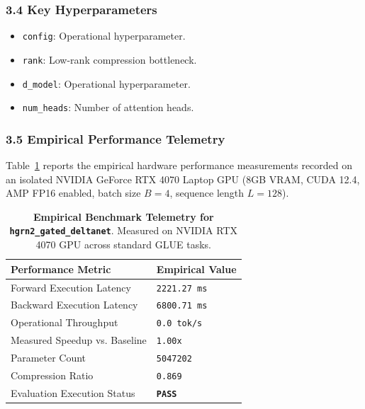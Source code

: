 \subsubsection*{3.4 Key Hyperparameters}
\begin{itemize}
    \item \texttt{config}: Operational hyperparameter.
    \item \texttt{rank}: Low-rank compression bottleneck.
    \item \texttt{d\_model}: Operational hyperparameter.
    \item \texttt{num\_heads}: Number of attention heads.
\end{itemize}

\subsubsection*{3.5 Empirical Performance Telemetry}
Table~\ref{tab:telemetry_hgrn2_gated_deltanet} reports the empirical hardware performance measurements recorded on an isolated NVIDIA GeForce RTX 4070 Laptop GPU (8GB VRAM, CUDA 12.4, AMP FP16 enabled, batch size $B=4$, sequence length $L=128$).

\begin{table}[h]
\centering
\small
\caption{\textbf{Empirical Benchmark Telemetry for \texttt{hgrn2\_gated\_deltanet}}. Measured on NVIDIA RTX 4070 GPU across standard GLUE tasks.}
\label{tab:telemetry_hgrn2_gated_deltanet}
\begin{tabularx}{\columnwidth}{lX}
\toprule
\textbf{Performance Metric} & \textbf{Empirical Value} \\
\midrule
Forward Execution Latency & \texttt{2221.27 ms} \\
Backward Execution Latency & \texttt{6800.71 ms} \\
Operational Throughput & \texttt{0.0 tok/s} \\
Measured Speedup vs. Baseline & \texttt{1.00x} \\
Parameter Count & \texttt{5047202} \\
Compression Ratio & \texttt{0.869} \\
Evaluation Execution Status & \textbf{\texttt{PASS}} \\
\bottomrule
\end{tabularx}
\end{table}

